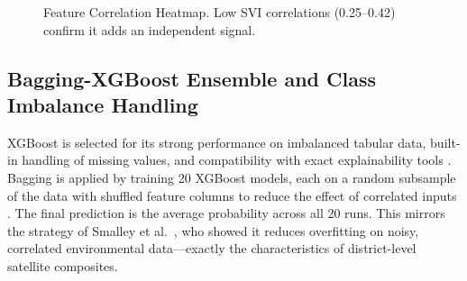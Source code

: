 \documentclass[conference]{IEEEtran}
\begin{document}
\begin{figure}[!t]
\centering
\newcommand{\hcell}[3]{%
  \pgfmathsetmacro{\pct}{max(1, min(99, (#3 - 0.20) / 0.80 * 100))}
  \fill[blue!\pct!white] (#1*0.72, -#2*0.72-0.9) rectangle (#1*0.72+0.72, -#2*0.72-0.9+0.72);
  \node[font=\tiny] at (#1*0.72+0.36, -#2*0.72-0.9+0.36) {#3};
}
\caption{Feature Correlation Heatmap. Low SVI correlations (0.25--0.42) confirm it adds an independent signal.}
\label{fig:heatmap}
\end{figure}

\subsection{Bagging-XGBoost Ensemble and Class Imbalance Handling}

XGBoost is selected for its strong performance on imbalanced tabular
data, built-in handling of missing values, and compatibility with
exact explainability tools \cite{rahman2025,smalley2025}. Bagging is
applied by training 20 XGBoost models, each on a random subsample of
the data with shuffled feature columns to reduce the effect of
correlated inputs \cite{smalley2025}. The final prediction is the
average probability across all 20 runs. This mirrors the strategy of
Smalley et al.\ \cite{smalley2025}, who showed it reduces overfitting
on noisy, correlated environmental data---exactly the characteristics
of district-level satellite composites.
\end{document}
